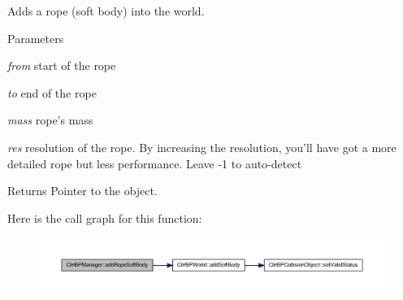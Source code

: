 \label{class_c_irr_b_p_manager_ae962ff163a13005f463aa51a351a0a87}
Adds a rope (soft body) into the world. 
\begin{DoxyParams}{Parameters}
\item[{\em from}]start of the rope \item[{\em to}]end of the rope \item[{\em mass}]rope's mass \item[{\em res}]resolution of the rope. By increasing the resolution, you'll have got a more detailed rope but less performance. Leave -\/1 to auto-\/detect \end{DoxyParams}
\begin{DoxyReturn}{Returns}
Pointer to the object. 
\end{DoxyReturn}


Here is the call graph for this function:\nopagebreak
\begin{figure}[H]
\begin{center}
\leavevmode
\includegraphics[width=400pt]{class_c_irr_b_p_manager_ae962ff163a13005f463aa51a351a0a87_cgraph}
\end{center}
\end{figure}


